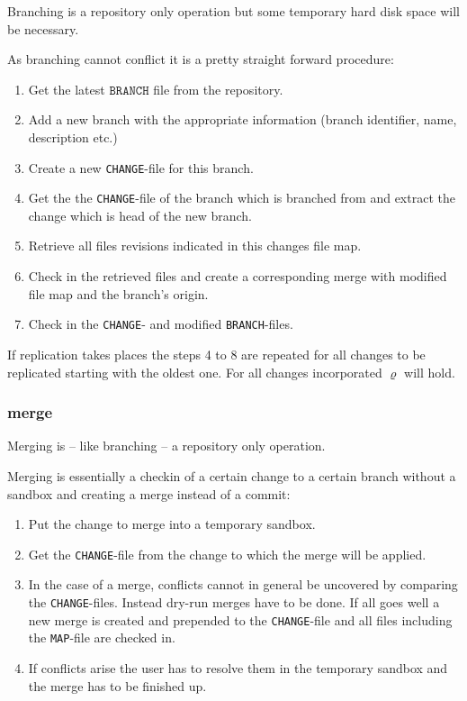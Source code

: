 \documentclass[fleqn, 10pt, a4paper]{report} \usepackage{amssymb}
\begin{document}
Branching is a repository only operation but some temporary hard disk
space will be necessary.

As branching cannot conflict it is a pretty straight forward
procedure:
\begin{enumerate}
\item Get the latest $\mathtt{BRANCH}$ file from the repository.
\item Add a new branch with the appropriate information (branch
  identifier, name, description etc.)
\item Create a new \texttt{CHANGE}-file for this branch.
\item Get the the \texttt{CHANGE}-file of the branch which is branched
  from and extract the change which is head of the new branch.
\item Retrieve all files revisions indicated in this changes file map.
\item Check in the retrieved files and create a corresponding merge
  with modified file map and the branch's origin.
\item Check in the \texttt{CHANGE}- and modified
  \texttt{BRANCH}-files.
\end{enumerate}

If replication takes places the steps 4 to 8 are repeated for all
changes to be replicated starting with the oldest one. For all changes
incorporated $\varrho$ will hold.

\subsubsection{merge}

Merging is -- like branching -- a repository only operation.

Merging is essentially a checkin of a certain change to a certain
branch without a sandbox and creating a merge instead of a commit:

\begin{enumerate}
\item Put the change to merge into a temporary sandbox.
\item Get the \texttt{CHANGE}-file from the change to which the merge
  will be applied.
\item In the case of a merge, conflicts cannot in general be uncovered
  by comparing the \texttt{CHANGE}-files. Instead dry-run merges have
  to be done. If all goes well a new merge is created and prepended to
  the \texttt{CHANGE}-file and all files including the
  \texttt{MAP}-file are checked in.
\item If conflicts arise the user has to resolve them in the temporary
  sandbox and the merge has to be finished up.
\end{enumerate}
\end{document}
